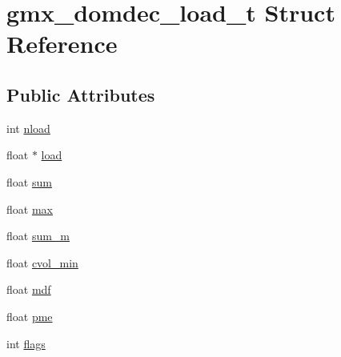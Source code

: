 \hypertarget{structgmx__domdec__load__t}{\section{gmx\-\_\-domdec\-\_\-load\-\_\-t \-Struct \-Reference}
\label{structgmx__domdec__load__t}
}
\subsection*{\-Public \-Attributes}
\begin{DoxyCompactItemize}
\item 
int \hyperlink{structgmx__domdec__load__t_a187c974d30fd3c5750041274c0c96990}{nload}
\item 
float $\ast$ \hyperlink{structgmx__domdec__load__t_a35a3950e8b8d5bba06402dabefe2cbc9}{load}
\item 
float \hyperlink{structgmx__domdec__load__t_a4dc5c6e755cc836394984384b1df4533}{sum}
\item 
float \hyperlink{structgmx__domdec__load__t_ae84b4b5d1a3cc7a139fb38f19b670d3c}{max}
\item 
float \hyperlink{structgmx__domdec__load__t_a3db0f70d8f90c70d8d5d1f60ddcff7ab}{sum\-\_\-m}
\item 
float \hyperlink{structgmx__domdec__load__t_aa51968f74b7eb5cd69938250cc62c34d}{cvol\-\_\-min}
\item 
float \hyperlink{structgmx__domdec__load__t_a72f01e1ab1dc1221133aaabf007b0e9c}{mdf}
\item 
float \hyperlink{structgmx__domdec__load__t_a5dc1a59c9ce645a9632a2c86bde0bd10}{pme}
\item 
int \hyperlink{structgmx__domdec__load__t_a3e69904bd5328fb7694d91344995c767}{flags}
\end{DoxyCompactItemize}



